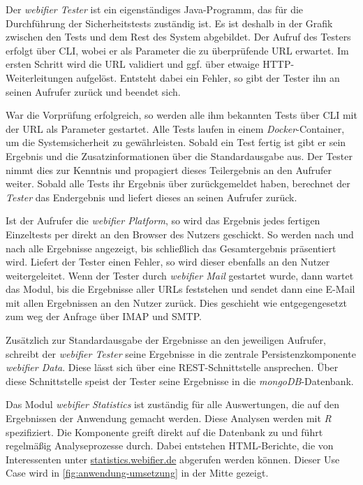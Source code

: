 Der \textit{webifier Tester} ist ein eigenständiges Java-Programm, das für die Durchführung der Sicherheitstests zuständig ist.
Es ist deshalb in der Grafik zwischen den Tests und dem Rest des System abgebildet.
Der Aufruf des Testers erfolgt über \ac{CLI}, wobei er als Parameter die zu überprüfende \ac{URL} erwartet.
Im ersten Schritt wird die \ac{URL} validiert und ggf. über etwaige \ac{HTTP}-Weiterleitungen aufgelöst.
Entsteht dabei ein Fehler, so gibt der Tester ihn an seinen Aufrufer zurück und beendet sich.

War die Vorprüfung erfolgreich, so werden alle ihm bekannten Tests über \ac{CLI} mit der \ac{URL} als Parameter gestartet.
Alle Tests laufen in einem \textit{Docker}-Container, um die Systemsicherheit zu gewährleisten.
Sobald ein Test fertig ist gibt er sein Ergebnis und die Zusatzinformationen über die Standardausgabe aus.
Der Tester nimmt dies zur Kenntnis und propagiert dieses Teilergebnis an den Aufrufer weiter.
Sobald alle Tests ihr Ergebnis über zurückgemeldet haben, berechnet der \textit{Tester} das Endergebnis und liefert dieses an seinen Aufrufer zurück.

Ist der Aufrufer die \textit{webifier Platform}, so wird das Ergebnis jedes fertigen Einzeltests per direkt an den Browser des Nutzers geschickt.
So werden nach und nach alle Ergebnisse angezeigt, bis schließlich das Gesamtergebnis präsentiert wird.
Liefert der Tester einen Fehler, so wird dieser ebenfalls an den Nutzer weitergeleitet.
Wenn der Tester durch \textit{webifier Mail} gestartet wurde, dann wartet das Modul, bis die Ergebnisse aller \acp{URL} feststehen und sendet dann eine E-Mail mit allen Ergebnissen an den Nutzer zurück.
Dies geschieht wie entgegengesetzt zum weg der Anfrage über \ac{IMAP} und \ac{SMTP}.

Zusätzlich zur Standardausgabe der Ergebnisse an den jeweiligen Aufrufer, schreibt der \textit{webifier Tester} seine Ergebnisse in die zentrale Persistenzkomponente \textit{webifier Data}.
Diese lässt sich über eine \ac{REST}-Schnittstelle ansprechen.
Über diese Schnittstelle speist der Tester seine Ergebnisse in die \textit{mongoDB}-Datenbank.

Das Modul \textit{webifier Statistics} ist zuständig für alle Auswertungen, die auf den Ergebnissen der Anwendung gemacht werden.
Diese Analysen werden mit \textit{R} spezifiziert.
Die Komponente greift direkt auf die Datenbank zu und führt regelmäßig Analyseprozesse durch.
Dabei entstehen \ac{HTML}-Berichte, die von Interessenten unter \url{statistics.webifier.de}
abgerufen werden können.
Dieser Use Case wird in \autoref{fig:anwendung-umsetzung} in der Mitte gezeigt.

